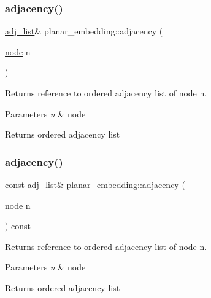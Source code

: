 \subsubsection{\texorpdfstring{adjacency()}{adjacency()}\hspace{0.1cm}{\footnotesize\ttfamily [1/2]}}
{\footnotesize\ttfamily \mbox{\hyperlink{classsymlist}{adj\+\_\+list}}\& planar\+\_\+embedding\+::adjacency (\begin{DoxyParamCaption}\item[{\mbox{\hyperlink{classnode}{node}}}]{n }\end{DoxyParamCaption})\hspace{0.3cm}{\ttfamily [inline]}}

Returns reference to ordered adjacency list of node {\ttfamily n}.


\begin{DoxyParams}{Parameters}
{\em n} & node\\
\hline
\end{DoxyParams}
\begin{DoxyReturn}{Returns}
ordered adjacency list 
\end{DoxyReturn}
\mbox{\label{classplanar__embedding_aa52d4454ff761f0130e8739a53efbe83}} 
\subsubsection{\texorpdfstring{adjacency()}{adjacency()}\hspace{0.1cm}{\footnotesize\ttfamily [2/2]}}
{\footnotesize\ttfamily const \mbox{\hyperlink{classsymlist}{adj\+\_\+list}}\& planar\+\_\+embedding\+::adjacency (\begin{DoxyParamCaption}\item[{\mbox{\hyperlink{classnode}{node}}}]{n }\end{DoxyParamCaption}) const\hspace{0.3cm}{\ttfamily [inline]}}

Returns reference to ordered adjacency list of node {\ttfamily n}.


\begin{DoxyParams}{Parameters}
{\em n} & node\\
\hline
\end{DoxyParams}
\begin{DoxyReturn}{Returns}
ordered adjacency list 
\end{DoxyReturn}
\mbox{\label{classplanar__embedding_a6462d40327bf7c4c91523b888bb45cb3}} 
